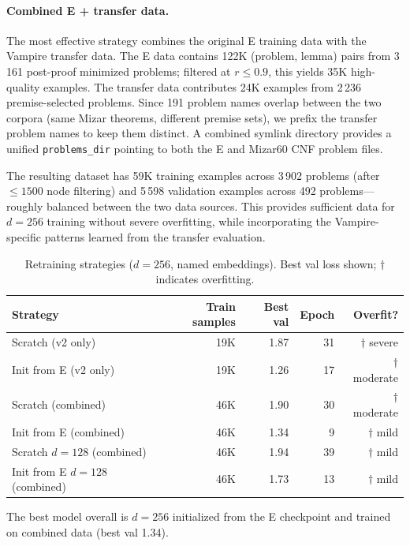 \documentclass{easychair}
\newcommand{\Eprover}{E\xspace}
\newcommand{\Vampire}{Vampire\xspace}
\newcommand{\Mizar}{Mizar\xspace}
\begin{document}
\paragraph{Combined E + transfer data.}
The most effective strategy combines the original \Eprover training
data with the \Vampire transfer data.  The \Eprover data contains
122K (problem, lemma) pairs from 3\,161 post-proof minimized
problems; filtered at $r \leq 0.9$, this yields 35K high-quality
examples.  The transfer data contributes 24K examples from 2\,236
premise-selected problems.  Since 191 problem names overlap between
the two corpora (same \Mizar theorems, different premise sets), we
prefix the transfer problem names to keep them distinct.
A combined symlink directory provides a unified \texttt{problems\_dir}
pointing to both the \Eprover and Mizar60 CNF problem files.

The resulting dataset has 59K training examples across 3\,902
problems (after ${\leq}1500$ node filtering) and 5\,598 validation
examples across 492 problems---roughly balanced between the two
data sources.  This provides sufficient data for $d{=}256$ training
without severe overfitting, while incorporating the \Vampire-specific
patterns learned from the transfer evaluation.

\begin{table}[t]
\centering
\caption{Retraining strategies ($d{=}256$, named embeddings).
  Best val loss shown; $\dagger$ indicates overfitting.}
\label{tab:retrain}
\small
\begin{tabular}{lrrrr}
\toprule
Strategy & Train samples & Best val & Epoch & Overfit? \\
\midrule
Scratch (v2 only)    & 19K & 1.87 & 31 & $\dagger$ severe \\
Init from E (v2 only)& 19K & 1.26 & 17 & $\dagger$ moderate \\
\midrule
Scratch (combined)        & 46K & 1.90 & 30 & $\dagger$ moderate \\
Init from E (combined)    & 46K & 1.34 &  9 & $\dagger$ mild \\
\midrule
Scratch $d{=}128$ (combined)    & 46K & 1.94 & 39 & $\dagger$ mild \\
Init from E $d{=}128$ (combined)& 46K & 1.73 & 13 & $\dagger$ mild \\
\bottomrule
\end{tabular}
\end{table}

The best model overall is $d{=}256$ initialized from the \Eprover
checkpoint and trained on combined data (best val 1.34).
\end{document}
